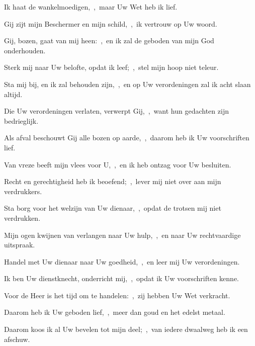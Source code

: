 \documentclass[12pt,twoside,a5paper]{article}
\begin{document}
\begin{halfparskip}
   Ik haat de wankelmoedigen,~\sep\ maar Uw Wet heb ik lief.


  Gij zijt mijn Beschermer en mijn schild,~\sep\ ik vertrouw op Uw woord.

  Gij, bozen, gaat van mij heen:~\sep\ en ik zal de geboden van mijn God onderhouden.

  Sterk mij naar Uw belofte, opdat ik leef;~\sep\ stel mijn hoop niet teleur.

  Sta mij bij, en ik zal behouden zijn,~\sep\ en op Uw verordeningen zal ik acht slaan altijd.

  Die Uw verordeningen verlaten, verwerpt Gij,~\sep\ want hun gedachten zijn bedrieglijk.

  Als afval beschouwt Gij alle bozen op aarde,~\sep\ daarom heb ik Uw voorschriften lief.

  Van vreze beeft mijn vlees voor U,~\sep\ en ik heb ontzag voor Uw besluiten.
\end{halfparskip}

\begin{halfparskip}
   Recht en gerechtigheid heb ik beoefend;~\sep\ lever mij niet over aan mijn verdrukkers.


  Sta borg voor het welzijn van Uw dienaar,~\sep\ opdat de trotsen mij niet verdrukken.

  Mijn ogen kwijnen van verlangen naar Uw hulp,~\sep\ en naar Uw rechtvaardige uitspraak.

  Handel met Uw dienaar naar Uw goedheid,~\sep\ en leer mij Uw verordeningen.

  Ik ben Uw dienstknecht, onderricht mij,~\sep\ opdat ik Uw voorschriften kenne.

  Voor de Heer is het tijd om te handelen:~\sep\ zij hebben Uw Wet verkracht.

  Daarom heb ik Uw geboden lief,~\sep\ meer dan goud en het edelst metaal.

  Daarom koos ik al Uw bevelen tot mijn deel;~\sep\ van iedere dwaalweg heb ik een afschuw.
\end{halfparskip}
\end{document}
